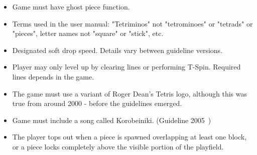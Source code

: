 \documentclass[a4paper]{article}
\begin{document}
\begin{itemize}
\item Game must have ghost piece function.
\item Terms used in the user manual: "Tetriminos" not "tetrominoes" or "tetrads" or "pieces", letter names not "square" or "stick", etc.
\item Designated soft drop speed. Details vary between guideline versions.
\item Player may only level up by clearing lines or performing T-Spin. Required lines depends in the game.
\item The game must use a variant of Roger Dean's Tetris logo, although this was true from around 2000 - before the guidelines emerged.
\item Game must include a song called Korobeiniki. (Guideline 2005~)
\item The player tops out when a piece is spawned overlapping at least one block, or a piece locks completely above the visible portion of the playfield.

\end{itemize}
\end{document}
